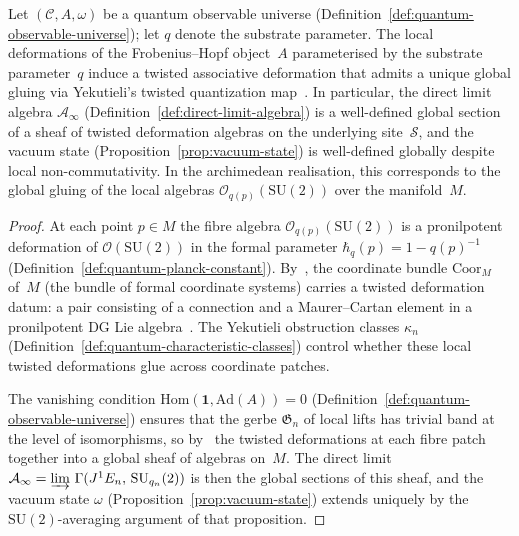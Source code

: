 \begin{proposition}
\label{prop:global-gluing}
Let $(\mathcal{C}, A, \omega)$ be a quantum observable universe
(Definition~\ref{def:quantum-observable-universe}); let $q$ denote the substrate parameter.  The local
deformations of the Frobenius--Hopf object~$A$ parameterised by the
substrate parameter~$q$ induce a twisted associative deformation that
admits a unique global gluing via Yekutieli's twisted quantization
map~\cite{yekutieli2008, yekutieli2010}.  In particular, the direct
limit algebra $\mathcal{A}_\infty$
(Definition~\ref{def:direct-limit-algebra}) is a well-defined global
section of a sheaf of twisted deformation algebras on the underlying
site~$\mathcal{S}$, and the vacuum state
(Proposition~\ref{prop:vacuum-state}) is well-defined globally despite
local non-commutativity.  In the archimedean realisation, this
corresponds to the global gluing of the local algebras
$\mathcal{O}_{q(p)}(\mathrm{SU}(2))$ over the manifold~$M$.
\end{proposition}

\begin{proof}
At each point $p \in M$ the fibre algebra
$\mathcal{O}_{q(p)}(\mathrm{SU}(2))$ is a pronilpotent deformation of
$\mathcal{O}(\mathrm{SU}(2))$ in the formal parameter
$\hbar_q(p) = 1 - q(p)^{-1}$
(Definition~\ref{def:quantum-planck-constant}).
By~\cite{yekutieli2008}, the coordinate bundle $\mathrm{Coor}_M$ of~$M$
(the bundle of formal coordinate systems) carries a twisted deformation
datum: a pair consisting of a connection and a Maurer--Cartan element in
a pronilpotent DG Lie algebra~\cite{yekutieli2009}.  The Yekutieli
obstruction classes $\kappa_n$
(Definition~\ref{def:quantum-characteristic-classes}) control whether
these local twisted deformations glue across coordinate patches.

The vanishing condition
$\mathrm{Hom}(\mathbf{1}, \mathrm{Ad}(A)) = 0$
(Definition~\ref{def:quantum-observable-universe}) ensures that the
gerbe $\mathfrak{G}_n$ of local lifts has trivial band at the level of
isomorphisms, so by~\cite[Theorem~4.5]{yekutieli2010} the twisted
deformations at each fibre patch together into a global sheaf of
algebras on~$M$.  The direct limit $\mathcal{A}_\infty =
\varinjlim\,\Gamma(J^1 E_n,\, \mathrm{SU}_{q_n}(2))$ is then the
global sections of this sheaf, and the vacuum state $\omega$
(Proposition~\ref{prop:vacuum-state}) extends uniquely by the
$\mathrm{SU}(2)$-averaging argument of that proposition.
\end{proof}


